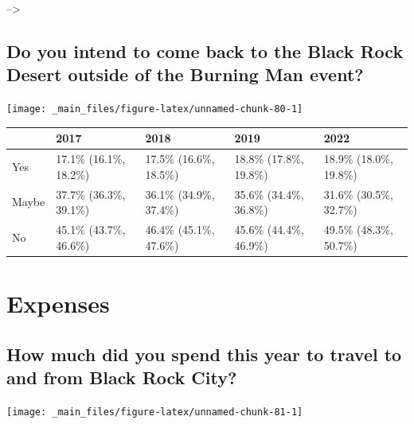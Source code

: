 \documentclass[
]{book}
\begin{document}
--\textgreater{}

\hypertarget{do-you-intend-to-come-back-to-the-black-rock-desert-outside-of-the-burning-man-event}{%
\subsection{Do you intend to come back to the Black Rock Desert outside of the Burning Man event?}\label{do-you-intend-to-come-back-to-the-black-rock-desert-outside-of-the-burning-man-event}}

\texttt{[image: \_main\_files/figure-latex/unnamed-chunk-80-1]}

\begin{table}
\centering
\begin{tabular}[t]{>{}l|>{}l|>{}l|>{}l|>{}l}
\hline
  & 2017 & 2018 & 2019 & 2022\\
\hline
Yes & 17.1\% (16.1\%, 18.2\%) & 17.5\% (16.6\%, 18.5\%) & 18.8\% (17.8\%, 19.8\%) & 18.9\% (18.0\%, 19.8\%)\\
\hline
Maybe & 37.7\% (36.3\%, 39.1\%) & 36.1\% (34.9\%, 37.4\%) & 35.6\% (34.4\%, 36.8\%) & 31.6\% (30.5\%, 32.7\%)\\
\hline
No & 45.1\% (43.7\%, 46.6\%) & 46.4\% (45.1\%, 47.6\%) & 45.6\% (44.4\%, 46.9\%) & 49.5\% (48.3\%, 50.7\%)\\
\hline
\end{tabular}
\end{table}

\hypertarget{expenses}{%
\section{Expenses}\label{expenses}}

\hypertarget{how-much-did-you-spend-this-year-to-travel-to-and-from-black-rock-city}{%
\subsection{How much did you spend this year to travel to and from Black Rock City?}\label{how-much-did-you-spend-this-year-to-travel-to-and-from-black-rock-city}}

\texttt{[image: \_main\_files/figure-latex/unnamed-chunk-81-1]}
\end{document}
